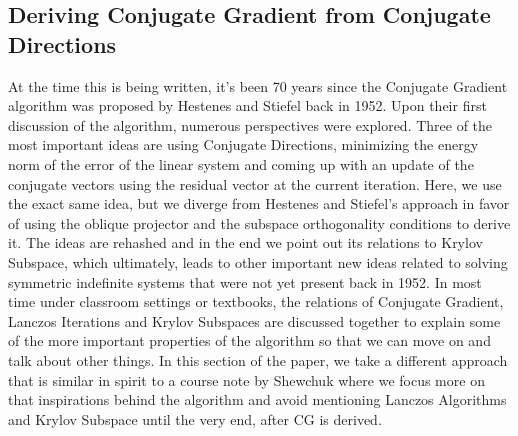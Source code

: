 \documentclass[]{article}
\theoremstyle{definition}
\begin{document}
     

    \subsection{Deriving Conjugate Gradient from Conjugate Directions}
        At the time this is being written, it's been 70 years since the Conjugate Gradient algorithm was proposed by Hestenes and Stiefel back in 1952\cite{paper:cg_original}. Upon their first discussion of the algorithm, numerous perspectives were explored. Three of the most important ideas are using Conjugate Directions, minimizing the energy norm of the error of the linear system and coming up with an update of the conjugate vectors using the residual vector at the current iteration. Here, we use the exact same idea, but we diverge from Hestenes and Stiefel's approach in favor of using the oblique projector and the subspace orthogonality conditions to derive it. The ideas are rehashed and in the end we point out its relations to Krylov Subspace, which ultimately, leads to other important new ideas related to solving symmetric indefinite systems that were not yet present back in 1952. In most time under classroom settings or textbooks, the relations of Conjugate Gradient, Lanczos Iterations and Krylov Subspaces are discussed together to explain some of the more important properties of the algorithm so that we can move on and talk about other things. In this section of the paper, we take a different approach that is similar in spirit to a course note by Shewchuk \cite{notes:painless_cg} where we focus more on that inspirations behind the algorithm and avoid mentioning Lanczos Algorithms and Krylov Subspace until the very end, after CG is derived.   
\end{document}
